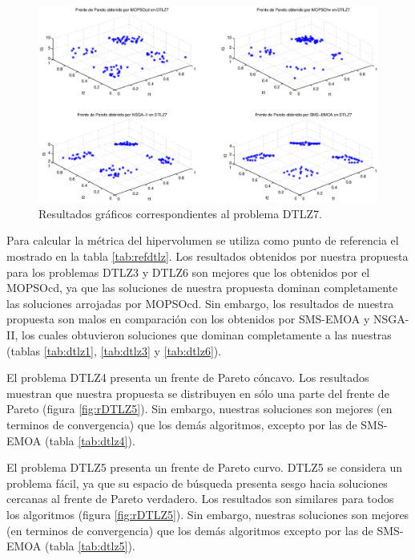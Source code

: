 \clearpage
\newpage

\begin{figure}
      \begin{center}
	  \includegraphics[scale=0.45]{Cap4/rdtlz7r.eps}
      \end{center}
	\caption{Resultados gr\'aficos correspondientes al problema DTLZ7.}
      \label{fig:rDTLZ7}
      \end{figure}
\clearpage

Para calcular la m\'etrica del hipervolumen se utiliza como punto de referencia el mostrado en la tabla \ref{tab:refdtlz}.
Los resultados obtenidos por nuestra propuesta para los problemas DTLZ3 y DTLZ6 son mejores que los obtenidos por el MOPSOcd,
ya que las soluciones de nuestra propuesta dominan completamente las soluciones arrojadas por MOPSOcd. 
Sin embargo, los resultados de nuestra propuesta son malos en comparaci\'on con los obtenidos por SMS-EMOA y NSGA-II, los cuales 
obtuvieron soluciones que dominan completamente a las nuestras (tablas \ref{tab:dtlz1}, \ref{tab:dtlz3} y \ref{tab:dtlz6}). 

El problema DTLZ4 presenta un frente de Pareto c\'oncavo. Los resultados muestran que nuestra propuesta se distribuyen 
en s\'olo una parte del frente de Pareto (figura \ref{fig:rDTLZ5}). Sin embargo, nuestras soluciones son mejores (en terminos de
convergencia) que los dem\'as algoritmos, excepto por las de SMS-EMOA (tabla \ref{tab:dtlz4}).

El problema DTLZ5 presenta un frente de Pareto curvo. DTLZ5 se considera un problema f\'acil, ya que su espacio de b\'usqueda 
presenta sesgo hacia soluciones cercanas al frente de Pareto verdadero. Los resultados son similares para todos los algoritmos 
(figura \ref{fig:rDTLZ5}). Sin embargo, nuestras soluciones son mejores (en terminos de convergencia) que los dem\'as algoritmos
excepto por las de SMS-EMOA (tabla \ref{tab:dtlz5}).

